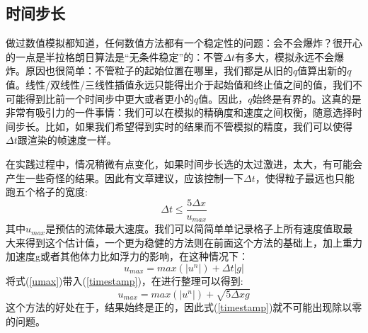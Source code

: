 \documentclass{article}
\begin{document}
\subsection{时间步长}
做过数值模拟都知道，任何数值方法都有一个稳定性的问题：会不会爆炸？很开心的一点是半拉格朗日算法是“无条件稳定”的：不管$\Delta{t}$有多大，模拟永远不会爆炸。原因也很简单：不管粒子的起始位置在哪里，我们都是从旧的$q$值算出新的$q$值。线性/双线性/三线性插值永远只能得出介于起始值和终止值之间的值，我们不可能得到比前一个时间步中更大或者更小的$q$值。因此，$q$始终是有界的。这真的是非常有吸引力的一件事情：我们可以在模拟的精确度和速度之间权衡，随意选择时间步长。比如，如果我们希望得到实时的结果而不管模拟的精度，我们可以使得$\Delta{t}$跟渲染的帧速度一样。
\par
在实践过程中，情况稍微有点变化，如果时间步长选的太过激进，太大，有可能会产生一些奇怪的结果。因此有文章建议，应该控制一下$\Delta{t}$，使得粒子最远也只能跑五个格子的宽度:
\begin{equation}
\Delta{t}\le{\frac{5\Delta{x}}{u_{max}}}  \label{timestamp}
\end{equation}
其中$u_{max}$是预估的流体最大速度。我们可以简简单单记录格子上所有速度值取最大来得到这个估计值，一个更为稳健的方法则在前面这个方法的基础上，加上重力加速度g或者其他体力比如浮力的影响，在这种情况下：
\begin{equation}
u_{max}=max(|u^n|)+\Delta{t}|g|   \label{umax}
\end{equation}
将式(\ref{umax})带入(\ref{timestamp})，在进行整理可以得到:
\begin{equation}
u_{max}=max(|u^n|)+\sqrt{5\Delta{x} g}   \label{umax_5times}
\end{equation}
这个方法的好处在于，结果始终是正的，因此式(\ref{timestamp})就不可能出现除以零的问题。
\end{document}
